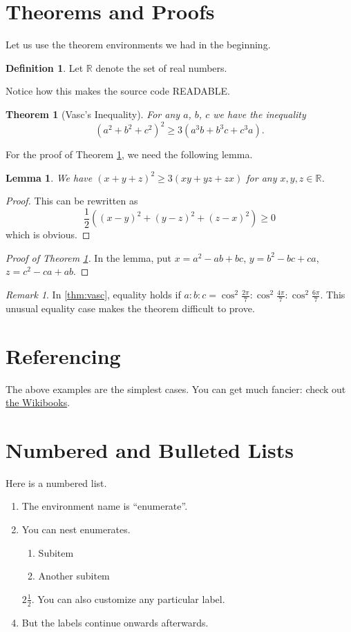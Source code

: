\documentclass[11pt]{article}
\theoremstyle{plain} %
\newtheorem*{theorem}{Theorem}
\newtheorem*{lemma}{Lemma}
\theoremstyle{definition}
\newtheorem*{definition}{Definition} %
\theoremstyle{example}
\theoremstyle{remark}
\newtheorem*{remark}{Remark}
\newcommand{\half}{\frac{1}{2}}
\begin{document}
\section{Theorems and Proofs}
\label{sec:theorem}
Let us use the theorem environments we had in the beginning.
\begin{definition}
	Let $\mathbb R$ denote the set of real numbers.
\end{definition}
Notice how this makes the source code READABLE.

\begin{theorem}
	[Vasc's Inequality]
	\label{thm:vasc}
	For any $a$, $b$, $c$ we have the inequality
	\[ \left( a^2+b^2+c^2 \right)^2 \ge 3\left( a^3b+b^3c+c^3a \right). \]
\end{theorem}

For the proof of Theorem \ref{thm:vasc}, we need the following lemma.

\begin{lemma}
	We have $\left( x+y+z \right)^2 \ge 3(xy+yz+zx)$ for any $x,y,z \in \mathbb R$.
\end{lemma}
\begin{proof}
	This can be rewritten as
	\[ \half\left( (x-y)^2+(y-z)^2+(z-x)^2 \right) \ge 0 \]
	which is obvious.
\end{proof}

\begin{proof}
	[Proof of Theorem \ref{thm:vasc}]
	In the lemma, put $x=a^2-ab+bc$, $y=b^2-bc+ca$, $z=c^2-ca+ab$.
\end{proof}

\begin{remark}
	In \autoref{thm:vasc}, equality holds if $a : b : c = \cos^2 \frac{2\pi}{7} : \cos^2 \frac{4\pi}{7} : \cos^2 \frac{6\pi}{7}$.
	This unusual equality case makes the theorem difficult to prove.
\end{remark}


\section{Referencing}
The above examples are the simplest cases.
You can get much fancier: check out
\href{http://en.wikibooks.org/wiki/LaTeX/Labels_and_Cross-referencing}{the Wikibooks}.

\section{Numbered and Bulleted Lists}
Here is a numbered list.
\begin{enumerate}
	\item The environment name is ``enumerate''.
	\item You can nest enumerates.
		\begin{enumerate}
			\item Subitem
			\item Another subitem
		\end{enumerate}
	\item[$2 \half$.] You can also customize any particular label.
	\item But the labels continue onwards afterwards.
\end{enumerate}
\end{document}
